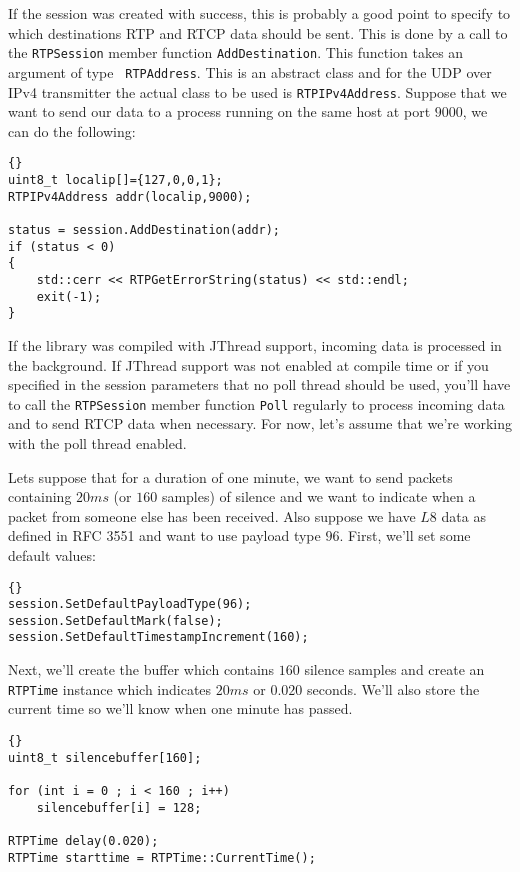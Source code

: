 \documentclass[12pt,a4paper]{article}
\begin{document}
			If the session was created with success, this is probably a good
			point to specify to which destinations RTP and RTCP data should be
			sent. This is done by a call to the {\tt RTPSession} member function
			{\tt AddDestination}. This function takes an argument of type {\tt
			RTPAddress}. This is an abstract class and for the UDP over IPv4
			transmitter the actual class to be used is {\tt RTPIPv4Address}.
			Suppose that we want to send our data to a process running on the
			same host at port $9000$, we can do the following:
			\begin{lstlisting}[frame=tb]{}
uint8_t localip[]={127,0,0,1};
RTPIPv4Address addr(localip,9000);

status = session.AddDestination(addr);
if (status < 0)
{
	std::cerr << RTPGetErrorString(status) << std::endl;
	exit(-1);
}
			\end{lstlisting}

			If the library was compiled with JThread support, incoming data is
			processed in the background. If JThread support was not enabled at
			compile time or if you specified in the session parameters that no
			poll thread should be used, you'll have to call the {\tt RTPSession}
			member function {\tt Poll} regularly to process incoming data and
			to send RTCP data when necessary. For now, let's assume that we're
			working with the poll thread enabled.

			Lets suppose that for a duration of one minute, we want to send
			packets containing $20 ms$ (or $160$ samples) of silence and we want
			to indicate when a packet from someone else has been received. Also
			suppose we have $L8$ data as defined in RFC 3551 and want to use
			payload type $96$. First, we'll set some default values:
			\begin{lstlisting}[frame=tb]{}
session.SetDefaultPayloadType(96);
session.SetDefaultMark(false);
session.SetDefaultTimestampIncrement(160);
			\end{lstlisting}

			Next, we'll create the buffer which contains $160$ silence samples
			and create an {\tt RTPTime} instance which indicates $20 ms$ or
			$0.020$ seconds. We'll also store the current time so we'll know
			when one minute has passed.
			\begin{lstlisting}[frame=tb]{}
uint8_t silencebuffer[160];

for (int i = 0 ; i < 160 ; i++)
	silencebuffer[i] = 128;

RTPTime delay(0.020);
RTPTime starttime = RTPTime::CurrentTime();
			\end{lstlisting}
\end{document}
